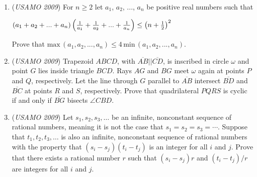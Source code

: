 \begin{enumerate}
 

	\item (\textit{USAMO 2009}) For $n \ge 2$ let $a_1$, $a_2$, ..., $a_n$ be positive real numbers such that 


 $(a_1+a_2+ ... +a_n)\left( {1 \over a_1} + {1 \over a_2} + ... +{1 \over a_n} \right) \le \left(n+ {1 \over 2} \right) ^2$

 Prove that $\text{max}\, (a_1, a_2, ... ,a_n) \le  4\, \text{min}\, (a_1, a_2, ... , a_n)$.


 

	\item (\textit{USAMO 2009}) Trapezoid $ABCD$, with $\overline{AB}||\overline{CD}$, is inscribed in circle $\omega$ and point $G$ lies inside triangle $BCD$.  Rays $AG$ and $BG$ meet $\omega$ again at points $P$ and $Q$, respectively.  Let the line through $G$ parallel to $\overline{AB}$ intersect $\overline{BD}$ and $\overline{BC}$ at points $R$ and $S$, respectively.  Prove that quadrilateral $PQRS$ is cyclic if and only if $\overline{BG}$ bisects $\angle CBD$.


 

	\item (\textit{USAMO 2009}) Let $s_1, s_2, s_3, \ldots$ be an infinite, nonconstant sequence of rational numbers, meaning it is not the case that $s_1 = s_2 = s_3 = \cdots.$  Suppose that $t_1, t_2, t_3, \ldots$ is also an infinite, nonconstant sequence of rational numbers with the property that $(s_i - s_j)(t_i - t_j)$ is an integer for all $i$ and $j$.  Prove that there exists a rational number $r$ such that $(s_i - s_j)r$ and $(t_i - t_j)/r$ are integers for all $i$ and $j$.


 

\end{enumerate}